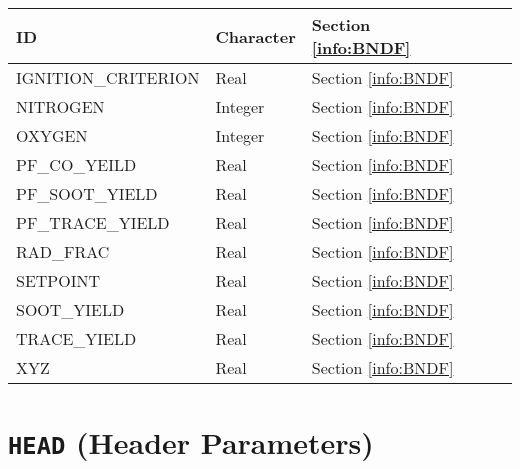 \begin{longtable}{@{\extracolsep{\fill}}|l|l|l|l|l|}
{\ct ID}        & Character   & Section \ref{info:BNDF}                 &           &                 \\ \hline
{\ct IGNITION\_CRITERION}        & Real   & Section \ref{info:BNDF}                 &           &                 \\ \hline
{\ct NITROGEN}        & Integer   & Section \ref{info:BNDF}                 &           &                 \\ \hline
{\ct OXYGEN}        & Integer   & Section \ref{info:BNDF}                 &           &                 \\ \hline
{\ct PF\_CO\_YEILD}        & Real   & Section \ref{info:BNDF}                 &           &                 \\ \hline
{\ct PF\_SOOT\_YIELD	}        & Real   & Section \ref{info:BNDF}                 &           &                 \\ \hline
{\ct PF\_TRACE\_YIELD}        & Real   & Section \ref{info:BNDF}                 &           &                 \\ \hline
{\ct RAD\_FRAC}        & Real   & Section \ref{info:BNDF}                 &           &                 \\ \hline
{\ct SETPOINT}        & Real   & Section \ref{info:BNDF}                 &           &                 \\ \hline
{\ct SOOT\_YIELD}        & Real   & Section \ref{info:BNDF}                 &           &                 \\ \hline
{\ct TRACE\_YIELD}        & Real   & Section \ref{info:BNDF}                 &           &                 \\ \hline
{\ct XYZ}        & Real   & Section \ref{info:BNDF}                 &           &                 \\ \hline
\end{longtable}

\vspace{\baselineskip}



\section{\texorpdfstring{{\tt HEAD}}{HEAD} (Header Parameters)}

